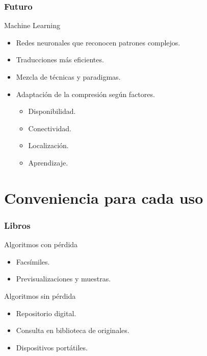 \documentclass{beamer}
\begin{document}
\begin{frame}
    \frametitle{Futuro}
    \centering
    \begin{block}{Machine Learning}
        \begin{itemize}
            \item Redes neuronales que reconocen patrones complejos.
            \item Traducciones más eficientes.
            \item Mezcla de técnicas y paradigmas.
            \item Adaptación de la compresión según factores.
            \begin{itemize}
                \item Disponibilidad.
                \item Conectividad.
                \item Localización.
                \item Aprendizaje.
            \end{itemize}
        \end{itemize}
    \end{block}
\end{frame}

\section{Conveniencia para cada uso}
\begin{frame}
    \frametitle{Libros}
    \begin{block}{Algoritmos con pérdida}
        \begin{itemize}
            \item Facsímiles.
            \item Previsualizaciones y muestras.
        \end{itemize}
    \end{block}
    \begin{exampleblock}{Algoritmos sin pérdida}
        \begin{itemize}
            \item Repositorio digital.
            \item Consulta en biblioteca de originales.
            \item Dispositivos portátiles.
        \end{itemize}
    \end{exampleblock}
\end{frame}
\end{document}
